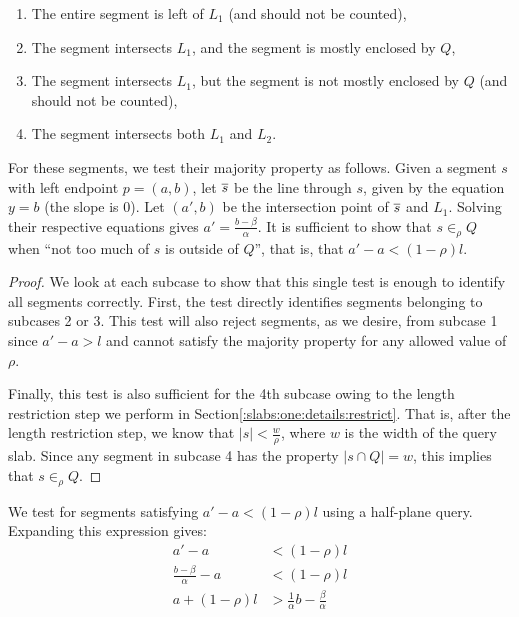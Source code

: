 \begin{enumerate}
 \item The entire segment is left of $L_1$ (and should not be counted),

 \item The segment intersects $L_1$, and the segment is mostly enclosed by $Q$,

 \item The segment intersects $L_1$, but the segment is not mostly enclosed by $Q$ (and should not be counted),

 \item The segment intersects both $L_1$ and $L_2$. 

\end{enumerate}

For these segments, we test their majority property as follows. Given a segment $s$ with left endpoint $p = (a,b)$, let $\overline{s}$ be the line through $s$, given by the equation $y = b$ (the slope is 0). Let $(a', b)$ be the intersection point of $\overline{s}$ and $L_1$. Solving their respective equations gives $a' = \frac{b - \beta}{\alpha}$. It is sufficient to show that $s \in_\rho Q$ when ``not too much of $s$ is outside of $Q$'', that is, that $a' - a < (1 - \rho)l$. 

\begin{proof}
We look at each subcase to show that this single test is enough to identify all segments correctly. First, the test directly identifies segments belonging to subcases 2 or 3. This test will also reject segments, as we desire, from subcase 1 since $a' - a > l$ and cannot satisfy the majority property for any allowed value of $\rho$. 

Finally, this test is also sufficient for the 4th subcase owing to the length restriction step we perform in Section\ref{:slabs:one:details:restrict}. That is, after the length restriction step, we know that $|s| < \frac{w}{\rho}$, where $w$ is the width of the query slab. Since any segment in subcase 4 has the property $|s \cap Q| = w$, this implies that $s \in_\rho Q$.
\end{proof}

We test for segments satisfying $a' - a < (1 - \rho)l$ using a half-plane query. Expanding this expression gives:
\[
\begin{split}
a' - a &< (1 - \rho)l \\
%
\frac{b - \beta}{\alpha} - a &< (1 - \rho)l \\
%
a + (1 - \rho)l &> \frac{1}{\alpha} b - \frac{\beta}{\alpha}  \\
\end{split}
\]

